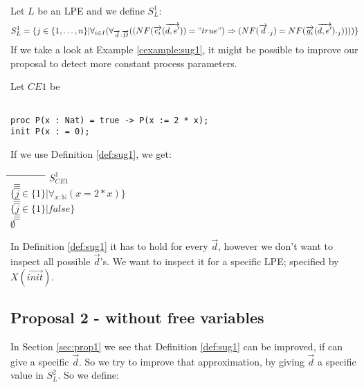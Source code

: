 \index{}\documentclass[a4paper,10pt]{article}
\theoremstyle{plain}
\theoremstyle{definition}
\newcommand{\ovr}{\overrightarrow}
\newcommand{\pps}{process parameters}
\newcommand{\tab}{\hspace*{5.mm} \= \hspace*{5.mm} \= \hspace*{5.mm} \= \hspace*{5.mm} \= \hspace*{5.mm} \= \hspace*{5.mm}  \= \hspace*{5.mm}  \= \hspace*{5.mm}  \= \hspace*{5.mm} \= \hspace*{5.mm} \= \hspace*{5.mm}  \= \hspace*{5.mm}  \= \hspace*{5.mm}\kill}
\begin{document}
\begin{defn} \label{def:sug1} Let $L$ be an LPE and we define $S_L^1$:
\begin{displaymath}
S_L^1 =
\lbrace   
j \in \lbrace 1, \ldots , n \rbrace \vert \forall_{i\in I} (\forall_{\ovr{d}: \ovr{D}}((NF(\ovr{c_i}(\ovr{d,e'})) = "true")  \Rightarrow (NF(\ovr{d}._j) = NF(\ovr{g_i}(\ovr{d,e'})._j))))\rbrace
\end{displaymath}
If we take a look at Example \ref{cexample:sug1}, it might be possible to improve our proposal to detect more constant \pps .
\begin{example}Let $CE1$ be \label{cexample:sug1}\begin{verbatim}

proc P(x : Nat) = true -> P(x := 2 * x);
init P(x : = 0);

\end{verbatim}
\end{example}
\begin{flushleft}
If we use Definition \ref{def:sug1}, we get:\\
\end{flushleft}
\begin{tabbing}
\tab
\> \> $S_{CE1}^1$\\
\> $\equiv$\\
\> \> $\lbrace j \in \lbrace 1 \rbrace \vert \forall_{x : \mathbb{N}}( x = 2 \ast x ) \rbrace $\\
\> $\equiv$ \\
\> \> $\lbrace j \in \lbrace 1 \rbrace \vert false \rbrace $\\
\> $\equiv$ \\
\> \> $\emptyset$ \\
\end{tabbing}
In Definition \ref{def:sug1} it has to hold for every $\ovr{d}$, however
we don't want to inspect all possible $\ovr{d}$'s. We want to inspect it for a specific LPE; specified by $X(\ovr{init})$.
\end{defn}

\subsection{Proposal 2 - without free variables}
In Section \ref{sec:prop1} we see that Definition \ref{def:sug1} can be improved, if can give a specific $\ovr{d}$. So we try to improve that approximation, by giving $\ovr{d}$ a specific value in $S_L^2$. So we define: 
\end{document}
